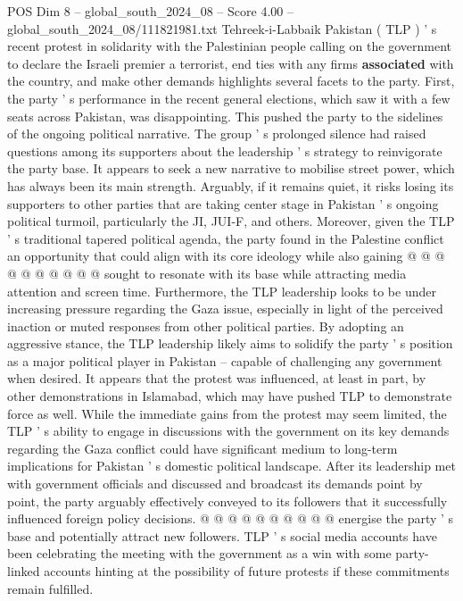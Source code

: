 \begin{textsample}{POS Dim 8 – global\_south\_2024\_08 – Score 4.00 – global\_south\_2024\_08/111821981.txt}  \label{ex:f8_pos_372}
Tehreek-i-Labbaik Pakistan ( TLP ) ' s recent protest in solidarity with the Palestinian people calling on the government to declare the Israeli premier a terrorist, end ties with any firms \textbf{associated} with the country, and make other demands highlights several facets to the party.
First, the party ' s performance in the recent general elections, which saw it with a few seats across Pakistan, was disappointing.
This pushed the party to the sidelines of the ongoing political narrative.
The group ' s prolonged silence had raised questions among its supporters about the leadership ' s strategy to reinvigorate the party base.
It appears to seek a new narrative to mobilise street power, which has always been its main strength.
Arguably, if it remains quiet, it risks losing its supporters to other parties that are taking center stage in Pakistan ' s ongoing political turmoil, particularly the JI, JUI-F, and others.
Moreover, given the TLP ' s traditional tapered political agenda, the party found in the Palestine conflict an opportunity that could align with its core ideology while also gaining @ @ @ @ @ @ @ @ @ @ sought to resonate with its base while attracting media attention and screen time.
Furthermore, the TLP leadership looks to be under increasing pressure regarding the Gaza issue, especially in light of the perceived inaction or muted responses from other political parties.
By adopting an aggressive stance, the TLP leadership likely aims to solidify the party ' s position as a major political player in Pakistan -- capable of challenging any government when desired.
It appears that the protest was influenced, at least in part, by other demonstrations in Islamabad, which may have pushed TLP to demonstrate force as well.
While the immediate gains from the protest may seem limited, the TLP ' s ability to engage in discussions with the government on its key demands regarding the Gaza conflict could have significant medium to long-term implications for Pakistan ' s domestic political landscape.
After its leadership met with government officials and discussed and broadcast its demands point by point, the party arguably effectively conveyed to its followers that it successfully influenced foreign policy decisions. @ @ @ @ @ @ @ @ @ @ energise the party ' s base and potentially attract new followers.
TLP ' s social media accounts have been celebrating the meeting with the government as a win with some party-linked accounts hinting at the possibility of future protests if these commitments remain fulfilled.

\end{textsample}
